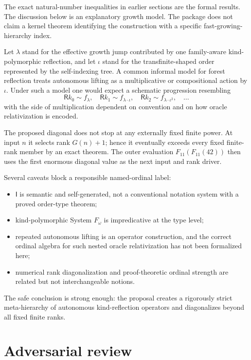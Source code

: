 \documentclass[11pt,oneside]{article}
\theoremstyle{definition}
\newcommand{\Index}{\mathsf I}
\newcommand{\Ram}{\mathsf Rk}
\begin{document}
\begin{warningbox}
The exact natural-number inequalities in earlier sections are the formal
results.  The discussion below is an explanatory growth model.  The package
does not claim a kernel theorem identifying the construction with a specific
fast-growing-hierarchy index.
\end{warningbox}

Let $\lambda$ stand for the effective growth jump contributed by one
family-aware kind-polymorphic reflection, and let $\iota$ stand for the
transfinite-shaped order represented by the self-indexing tree.  A common
informal model for forest reflection treats autonomous lifting as a
multiplicative or compositional action by $\iota$.  Under such a model one
would expect a schematic progression resembling
\[
 \Ram_0\sim f_{\lambda},\quad
 \Ram_1\sim f_{\lambda\cdot\iota},\quad
 \Ram_2\sim f_{\lambda\cdot\iota^2},\quad\ldots
\]
with the side of multiplication dependent on convention and on how oracle
relativization is encoded.

The proposed diagonal does not stop at any externally fixed finite power.  At
input $n$ it selects rank $G(n)+1$; hence it eventually exceeds every fixed
finite-rank member by an exact theorem.  The outer evaluation
$F_{11}(F_{11}(42))$ then uses the first enormous diagonal value as the next
input and rank driver.

Several caveats block a responsible named-ordinal label:
\begin{itemize}
  \item $\Index$ is semantic and self-generated, not a conventional notation
        system with a proved order-type theorem;
  \item kind-polymorphic System $F_\omega$ is impredicative at the type level;
  \item repeated autonomous lifting is an operator construction, and the
        correct ordinal algebra for such nested oracle relativization has not
        been formalized here;
  \item numerical rank diagonalization and proof-theoretic ordinal strength
        are related but not interchangeable notions.
\end{itemize}

The safe conclusion is strong enough: the proposal creates a rigorously strict
meta-hierarchy of autonomous kind-reflection operators and diagonalizes beyond
all fixed finite ranks.

\section{Adversarial review}
\end{document}
